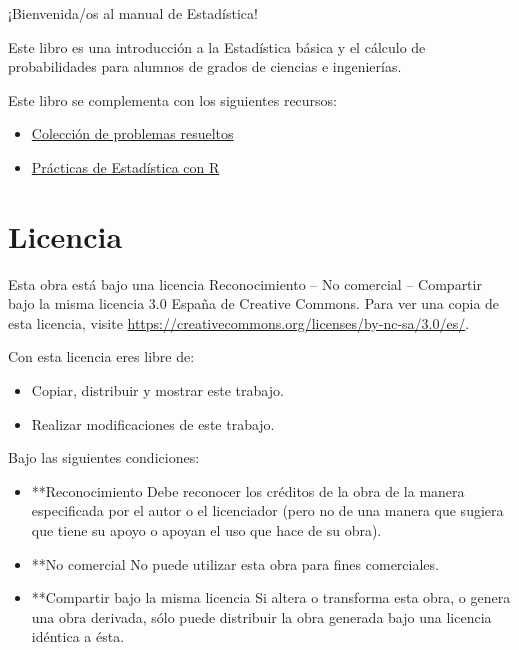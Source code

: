 \documentclass[
  a4paper,
]{scrreport}
\providecommand{\tightlist}{%
  \setlength{\itemsep}{0pt}\setlength{\parskip}{0pt}}\usepackage{longtable,booktabs,array}
\theoremstyle{plain}
\theoremstyle{definition}
\theoremstyle{definition}
\theoremstyle{remark}
\begin{document}

¡Bienvenida/os al manual de Estadística!

Este libro es una introducción a la Estadística básica y el cálculo de
probabilidades para alumnos de grados de ciencias e ingenierías.

Este libro se complementa con los siguientes recursos:

\begin{itemize}
\tightlist
\item
  \href{https://aprendeconalf.es/estadistica-ejercicios/}{Colección de
  problemas resueltos}
\item
  \href{https://aprendeconalf.es/estadistica-practicas-r/}{Prácticas de
  Estadística con R}
\end{itemize}

\section*{Licencia}\label{licencia}


Esta obra está bajo una licencia Reconocimiento -- No comercial --
Compartir bajo la misma licencia 3.0 España de Creative Commons. Para
ver una copia de esta licencia, visite
\url{https://creativecommons.org/licenses/by-nc-sa/3.0/es/}.

Con esta licencia eres libre de:

\begin{itemize}
\tightlist
\item
  Copiar, distribuir y mostrar este trabajo.
\item
  Realizar modificaciones de este trabajo.
\end{itemize}

Bajo las siguientes condiciones:

\begin{itemize}
\item
  **Reconocimiento Debe reconocer los créditos de la obra de la manera
  especificada por el autor o el licenciador (pero no de una manera que
  sugiera que tiene su apoyo o apoyan el uso que hace de su obra).
\item
  **No comercial No puede utilizar esta obra para fines comerciales.
\item
  **Compartir bajo la misma licencia Si altera o transforma esta obra, o
  genera una obra derivada, sólo puede distribuir la obra generada bajo
  una licencia idéntica a ésta.
\end{itemize}
\end{document}
